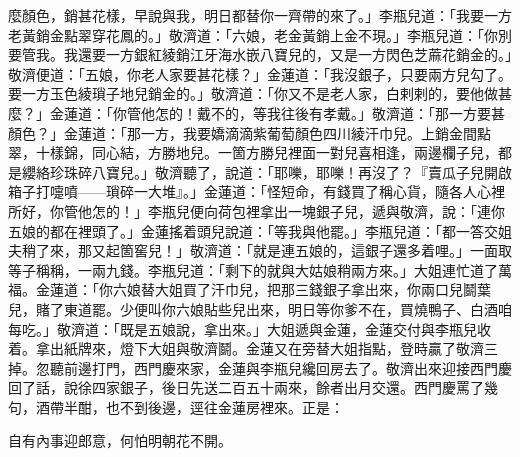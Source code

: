 麼顏色，銷甚花樣，早說與我，明日都替你一齊帶的來了。」李瓶兒道：「我要一方老黃銷金點翠穿花鳳的。」敬濟道：「六娘，老金黃銷上金不現。」李瓶兒道：「你別要管我。我還要一方銀紅綾銷江牙海水嵌八寶兒的，又是一方閃色芝蔴花銷金的。」敬濟便道：「五娘，你老人家要甚花樣？」金蓮道：「我沒銀子，只要兩方兒勾了。要一方玉色綾瑣子地兒銷金的。」敬濟道：「你又不是老人家，白剌剌的，要他做甚麼？」金蓮道：「你管他怎的！戴不的，等我往後有孝戴。」{}敬濟道：「那一方要甚顏色？」金蓮道：「那一方，我要嬌滴滴紫葡萄顏色四川綾汗巾兒。上銷金間點翠，十樣錦，同心結，方勝地兒。一箇方勝兒裡面一對兒喜相逢，兩邊欄子兒，都是纓絡珍珠碎八寶兒。」敬濟聽了，說道：「耶嚛，耶嚛！再沒了？『賣瓜子兒開啟箱子打嚏噴——瑣碎一大堆』。」金蓮道：「怪短命，有錢買了稱心貨，隨各人心裡所好，你管他怎的！」李瓶兒便向荷包裡拿出一塊銀子兒，遞與敬濟，說：「連你五娘的都在裡頭了。」金蓮搖着頭兒說道：「等我與他罷。」{}李瓶兒道：「都一答交姐夫稍了來，那又起箇窖兒！」敬濟道：「就是連五娘的，這銀子還多着哩。」一面取等子稱稱，一兩九錢。李瓶兒道：「剩下的就與大姑娘稍兩方來。」大姐連忙道了萬福。金蓮道：「你六娘替大姐買了汗巾兒，把那三錢銀子拿出來，你兩口兒鬬葉兒，賭了東道罷。{}少便叫你六娘貼些兒出來，{}明日等你爹不在，買燒鴨子、白酒咱每吃。」敬濟道：「既是五娘說，拿出來。」大姐遞與金蓮，金蓮交付與李瓶兒收着。拿出紙牌來，燈下大姐與敬濟鬬。金蓮又在旁替大姐指點，登時贏了敬濟三掉。忽聽前邊打門，西門慶來家，金蓮與李瓶兒纔回房去了。敬濟出來迎接西門慶回了話，說徐四家銀子，後日先送二百五十兩來，餘者出月交還。西門慶罵了幾句，酒帶半酣，也不到後邊，逕往金蓮房裡來。正是：

\begin{myquote}
自有內事迎郎意，何怕明朝花不開。
\end{myquote}

